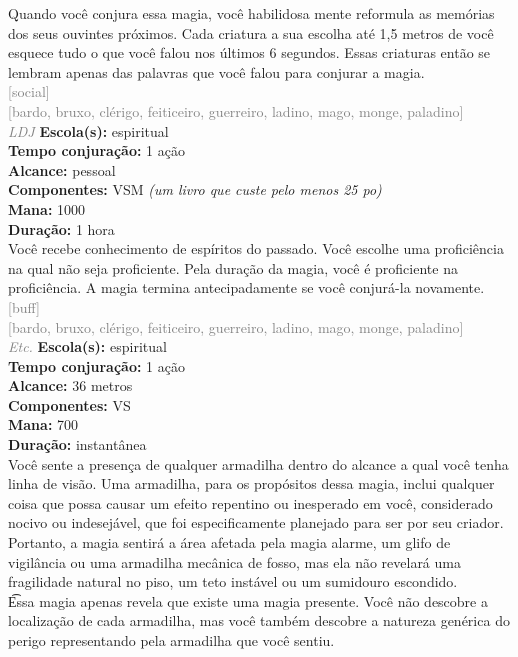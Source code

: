 \documentclass{RPG_Adventure}[2021/10/20]
\begin{document}
{\normalsize Quando você conjura essa magia, você habilidosa mente reformula as memórias dos seus ouvintes próximos. Cada criatura a sua escolha até 1,5 metros de você esquece tudo o que você falou nos últimos 6 segundos. Essas criaturas então se lembram apenas das palavras que você falou para conjurar a magia.\\}
{\scriptsize \textcolor{gray}{[social]\\}}
{\scriptsize \textcolor{gray}{[bardo, bruxo, clérigo, feiticeiro, guerreiro, ladino, mago, monge, paladino]\\}}
{\tiny \textcolor{gray}{\textit{LDJ}}}
{\small \t \textbf{Escola(s):} espiritual\\\t \textbf{Tempo conjuração:} 1 ação\\\t \textbf{Alcance:} pessoal\\\t \textbf{Componentes:} VSM \textit{(um livro que custe pelo menos 25 po)}\\\t \textbf{Mana:} 1000\\\t \textbf{Duração:} 1 hora\\}
{\normalsize Você recebe conhecimento de espíritos do passado. Você escolhe uma proficiência na qual não seja proficiente. Pela duração da magia, você é proficiente na proficiência. A magia termina antecipadamente se você conjurá-la novamente.\\}
{\scriptsize \textcolor{gray}{[buff]\\}}
{\scriptsize \textcolor{gray}{[bardo, bruxo, clérigo, feiticeiro, guerreiro, ladino, mago, monge, paladino]\\}}
{\tiny \textcolor{gray}{\textit{Etc.}}}
{\small \t \textbf{Escola(s):} espiritual\\\t \textbf{Tempo conjuração:} 1 ação\\\t \textbf{Alcance:} 36 metros\\\t \textbf{Componentes:} VS\\\t \textbf{Mana:} 700\\\t \textbf{Duração:} instantânea\\}
{\normalsize Você sente a presença de qualquer armadilha dentro do alcance a qual você tenha linha de visão. Uma armadilha, para os propósitos dessa magia, inclui qualquer coisa que possa causar um efeito repentino ou inesperado em você, considerado nocivo ou indesejável, que foi especificamente planejado para ser por seu criador. Portanto, a magia sentirá a área afetada pela magia alarme, um glifo de vigilância ou uma armadilha mecânica de fosso, mas ela não revelará uma fragilidade natural no piso, um teto instável ou um sumidouro escondido.\\\t Essa magia apenas revela que existe uma magia presente. Você não descobre a localização de cada armadilha, mas você também descobre a natureza genérica do perigo representando pela armadilha que você sentiu.\\}
\end{document}
